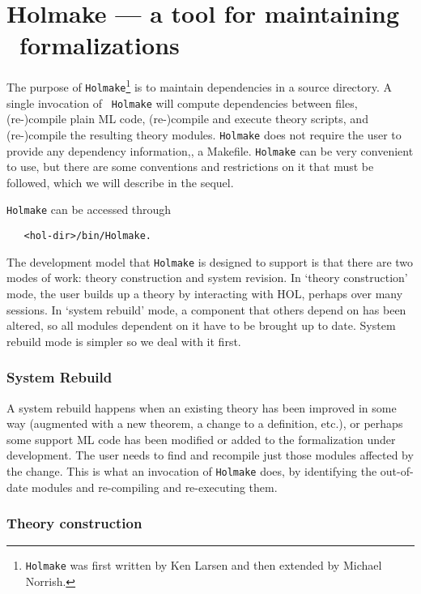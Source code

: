 \section{Holmake --- a tool for maintaining \HOL\ formalizations}\label{Holmake}  

The purpose of \verb+Holmake+\footnote{{\tt Holmake} was first written
  by Ken Larsen and then extended by Michael Norrish.} is to maintain
dependencies in a \holn{} source directory. A single invocation of {\tt
  Holmake} will compute dependencies between files, (re-)compile plain
ML code, (re-)compile and execute theory scripts, and (re-)compile the
resulting theory modules. {\tt Holmake} does not require the user to
provide any dependency information,\eg, a Makefile. {\tt Holmake} can
be very convenient to use, but there are some conventions and
restrictions on it that must be followed, which we will describe in
the sequel.

{\tt Holmake} can be accessed through
\begin{verbatim}
   <hol-dir>/bin/Holmake.
\end{verbatim}

The development model that {\tt Holmake} is designed to support is that
there are two modes of work: theory construction and system revision.
In `theory construction' mode, the user builds up a theory by
interacting with HOL, perhaps over many sessions. In `system rebuild'
mode, a component that others depend on has been altered, so all modules
dependent on it have to be brought up to date. System rebuild mode is
simpler so we deal with it first.  

\subsubsection{System Rebuild}

A system rebuild happens when an existing theory has been improved in
some way (augmented with a new theorem, a change to a definition, etc.),
or perhaps some support ML code has been modified or added to the
formalization under development. The user needs to find and recompile
just those modules affected by the change. This is what an invocation of
{\tt Holmake} does, by identifying the out-of-date modules and
re-compiling and re-executing them.  


\subsubsection{Theory construction}

